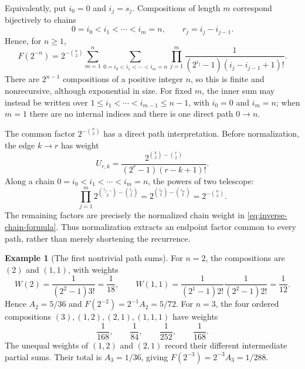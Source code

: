 \documentclass[11pt,oneside]{article}
\theoremstyle{definition}
\newtheorem{example}[theorem]{Example}
\theoremstyle{remark}
\begin{document}
Equivalently, put $i_0=0$ and $i_j=s_j$.  Compositions of length $m$ correspond bijectively
to chains
\begin{equation*}
 0=i_0<i_1<\cdots<i_m=n,
 \qquad r_j=i_j-i_{j-1}.
\end{equation*}
Hence, for $n\ge1$,
\begin{equation}
 F(2^{-n})=2^{-\binom n2}
 \sum_{m=1}^{n}
 \sum_{0=i_0<i_1<\cdots<i_m=n}
 \prod_{j=1}^{m}
 \frac{1}{(2^{i_j}-1)(i_j-i_{j-1}+1)!}.                 \label{eq:inverse-chain-formula}
\end{equation}
There are $2^{n-1}$ compositions of a positive integer $n$, so this is finite and
nonrecursive, although exponential in size.  For fixed $m$, the inner sum may instead be
written over $1\le i_1<\cdots<i_{m-1}\le n-1$, with $i_0=0$ and $i_m=n$; when $m=1$
there are no internal indices and there is one direct path $0\to n$.

The common factor $2^{-\binom n2}$ has a direct path interpretation.  Before normalization,
the edge $k\to r$ has weight
\begin{equation}
 U_{r,k}=\frac{2^{\binom k2-\binom r2}}
 {(2^r-1)(r-k+1)!}.                                      \label{eq:inverse-original-edge}
\end{equation}
Along a chain $0=i_0<i_1<\cdots<i_m=n$, the powers of two telescope:
\begin{equation}
 \prod_{j=1}^{m}2^{\binom{i_{j-1}}2-\binom{i_j}2}
 =2^{\binom{i_0}2-\binom{i_m}2}
 =2^{-\binom n2}.                                        \label{eq:inverse-path-telescope}
\end{equation}
The remaining factors are precisely the normalized chain weight in
\eqref{eq:inverse-chain-formula}.  Thus normalization extracts an endpoint factor common
to every path, rather than merely shortening the recurrence.

\begin{example}[The first nontrivial path sums]
For $n=2$, the compositions are $(2)$ and $(1,1)$, with weights
\begin{equation*}
 W(2)=\frac1{(2^2-1)3!}=\frac1{18},\qquad
 W(1,1)=\frac1{(2^1-1)2!}\frac1{(2^2-1)2!}=\frac1{12}.
\end{equation*}
Hence $A_2=5/36$ and $F(2^{-2})=2^{-1}A_2=5/72$.  For $n=3$, the four ordered
compositions $(3),(1,2),(2,1),(1,1,1)$ have weights
\begin{equation*}
 \frac1{168},\qquad\frac1{84},\qquad\frac1{252},\qquad\frac1{168}.
\end{equation*}
The unequal weights of $(1,2)$ and $(2,1)$ record their different intermediate partial
sums.  Their total is $A_3=1/36$, giving $F(2^{-3})=2^{-3}A_3=1/288$.
\end{example}
\end{document}
